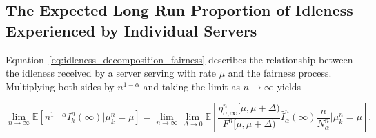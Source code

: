 \documentclass[a4paper,11pt,twoside]{article}
\numberwithin{equation}{section}
\numberwithin{figure}{section}
\theoremstyle{plain}
\newcommand{\EE}{\mathbb{E}}
\newcommand{\NN}{\mathbb{N}}
\newcommand{\1}{\mathbbm{1}}
\begin{document}
\subsection{The Expected Long Run Proportion of Idleness Experienced by Individual Servers}

Equation~\eqref{eq:idleness_decomposition_fairness} describes the relationship between the idleness received by a server serving with rate $\mu$ and the fairness process. Multiplying both sides by $n^{1-\alpha}$ and taking the limit as $n\to\infty$ yields 

\begin{equation}
    \lim_{n\to \infty} \EE[n^{1-\alpha}I_k^n(\infty)|\mu_k^n=\mu]=\lim_{n\to \infty}\lim_{\Delta\to 0}\EE\left[\frac{\eta_{\alpha,\infty}^n[\mu,\mu+\Delta)}{F^n[\mu, \mu+\Delta)}\hat{I}_\alpha^n(\infty)\frac{n}{N_\alpha^n}|\mu_k^n=\mu\right].\label{eq:limit_individual}
\end{equation}
\end{document}
